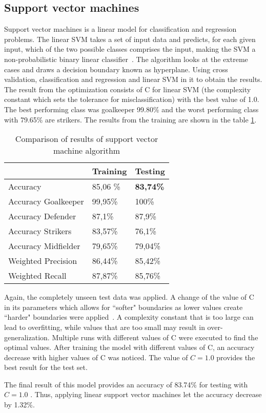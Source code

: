 \subsection{Support vector machines}
Support vector machines is a linear model for classification and regression problems. The linear SVM takes a set of input data and predicts, for each given input, which of the two possible classes comprises the input, making the SVM a non-probabilistic binary linear classifier~\cite{ref_rapidminersvm}. \newline The algorithm looks at the extreme cases and draws a decision boundary known as hyperplane. Using cross validation, classification and regression and linear SVM in it to obtain the results. The result from the optimization consists of C for linear SVM (the complexity constant which sets the tolerance for misclassification) with the best value of 1.0. The best performing class was goalkeeper 99.80\% and the worst performing class with 79.65\% are strikers. The results from the training are shown in the table \ref{Tab:SVM}.

\begin{table}[]
\centering
\begin{tabular}{@{}l|ll@{}}
\toprule
                    & Training & Testing \\ \midrule
Accuracy            & 85,06 \% & \textbf{83,74\%} \\ \midrule
Accuracy Goalkeeper & 99,95\%  & 100\%   \\
Accuracy Defender   & 87,1\%   & 87,9\%  \\
Accuracy Strikers   & 83,57\%  & 76,1\%  \\
Accuracy Midfielder & 79,65\%  & 79,04\% \\ \midrule
Weighted Precision  & 86,44\%  & 85,42\% \\
Weighted Recall     & 87,87\%  & 85,76\% \\ \bottomrule
\end{tabular}
\label{Tab:SVM}
\caption{Comparison of results of support vector machine algorithm}
\end{table}
Again, the completely unseen test data was applied. A change of the value of C in its parameters which allows for ``softer" boundaries as lower values create ``harder" boundaries were applied~\cite{ref_rapidminersvm2}. A complexity constant that is too large can lead to overfitting, while values that are too small may result in over-generalization. Multiple runs with different values of C were executed to find the optimal values. After training the model  with different values of C, an accuracy decrease with higher values of C was noticed. The value of $C=1.0$ provides the best result for the test set. 

The final result of this model provides an accuracy of 83.74\% for testing with $C=1.0$ . Thus, applying linear support vector machines let the accuracy decrease by 1.32\%.

